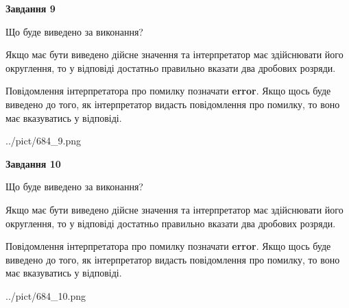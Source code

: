 \documentclass[12pt, ukrainian]{article}
\begin{document}
{\begin {Large}
{\begin {center}\textbf{Завдання 9}\end {center}}\par
Що буде виведено за виконання? \par

Якщо має бути виведено дійсне значення та інтерпретатор має здійснювати його округлення, 
то у відповіді достатньо правильно вказати два дробових розряди.

Повідомлення інтерпретатора про помилку позначати \textbf{error}.
Якщо щось буде виведено до того, як інтерпретатор видасть повідомлення про помилку, 
то воно має вказуватись у відповіді. \par

\begin{center}
	{../pict/684_9.png}
\end{center}
\newpage

{\begin {center}\textbf{Завдання 10}\end {center}}\par
Що буде виведено за виконання? \par

Якщо має бути виведено дійсне значення та інтерпретатор має здійснювати його округлення, 
то у відповіді достатньо правильно вказати два дробових розряди.

Повідомлення інтерпретатора про помилку позначати \textbf{error}.
Якщо щось буде виведено до того, як інтерпретатор видасть повідомлення про помилку, 
то воно має вказуватись у відповіді. \par

\begin{center}
	{../pict/684_10.png}
\end{center}
\newpage

\end {Large}}
\end{document}
